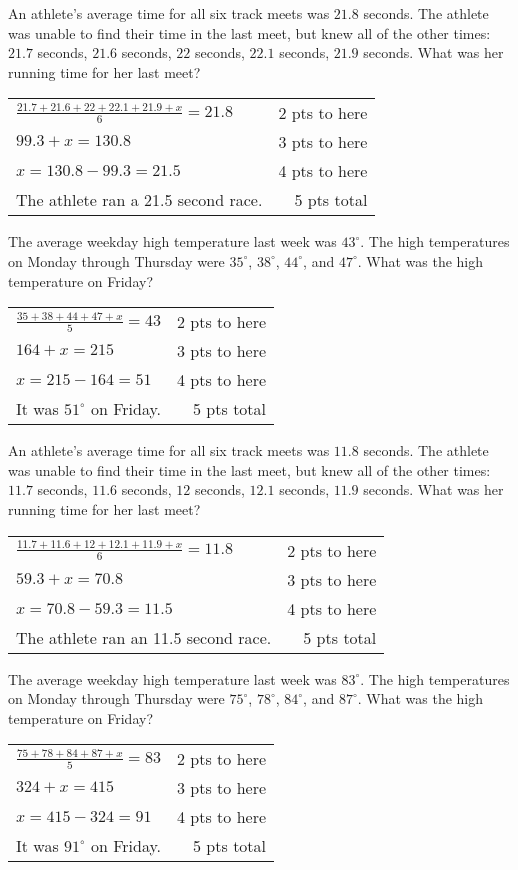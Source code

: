 {
	An athlete's average time for all six track meets was $21.8$ seconds. The athlete was unable to find their time in the last meet, but knew all of the other times: $21.7$ seconds, $21.6$ seconds, $22$ seconds, $22.1$ seconds, $21.9$ seconds. What was her running time for her last meet?
}
{
	\begin{tabular}{l r}
	$\frac{21.7+21.6+22+22.1+21.9+x}{6}=21.8$ & 2 pts to here\\
	$ 99.3 +x=130.8$ & 3 pts to here\\
	$x=130.8-99.3=21.5$ & 4 pts to here\\
	The athlete ran a 21.5 second race. & 5 pts  total\\
	\end{tabular}
}

{
	The average weekday high temperature last week was $43^{\circ}$. The high temperatures on Monday through Thursday were $35^{\circ}$, $38^{\circ}$, $44^{\circ}$, and $47^{\circ}$. What was the high temperature on Friday?
}
{
	\begin{tabular}{l r}
	$\frac{35+38+44+47+x}{5}=43$ & 2 pts to here\\
	$164 +x=215$ & 3 pts to here\\
	$x=215-164=51$ & 4 pts to here\\
	It was $51^{\circ}$ on Friday. & 5 pts total
	\end{tabular}
}

{
	An athlete's average time for all six track meets was $11.8$ seconds. The athlete was unable to find their time in the last meet, but knew all of the other times: $11.7$ seconds, $11.6$ seconds, $12$ seconds, $12.1$ seconds, $11.9$ seconds. What was her running time for her last meet?
}
{
	\begin{tabular}{l r}
	$\frac{11.7+11.6+12+12.1+11.9+x}{6}=11.8$ & 2 pts to here\\
	$ 59.3 +x=70.8$ & 3 pts to here\\
	$x=70.8-59.3=11.5$ & 4 pts to here\\
	The athlete ran an 11.5 second race. & 5 pts  total\\
	\end{tabular}
}

{
	The average weekday high temperature last week was $83^{\circ}$. The high temperatures on Monday through Thursday were $75^{\circ}$, $78^{\circ}$, $84^{\circ}$, and $87^{\circ}$. What was the high temperature on Friday?
}
{
	\begin{tabular}{l r}
	$\frac{75+78+84+87+x}{5}=83$ & 2 pts to here\\
	$324 +x=415$ & 3 pts to here\\
	$x=415-324=91$ & 4 pts to here\\
	It was $91^{\circ}$ on Friday. & 5 pts total
	\end{tabular}
}

